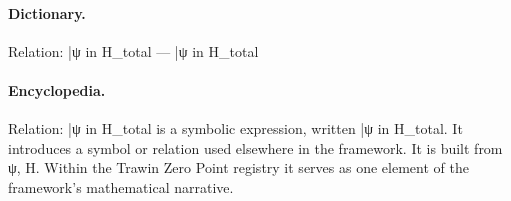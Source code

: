 \paragraph{Dictionary.}
Relation: |ψ in H\_total — |ψ in H\_total

\paragraph{Encyclopedia.}
Relation: |ψ in H\_total is a symbolic expression, written |ψ in H\_total. It introduces a symbol or relation used elsewhere in the framework. It is built from ψ, H. Within the Trawin Zero Point registry it serves as one element of the framework's mathematical narrative.
